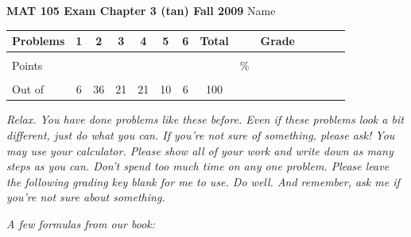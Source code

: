 \documentclass[12pt]{article}
\begin{document}
{\bf MAT 105 Exam Chapter 3 (tan) Fall 2009} \hspace{.4in} {\large Name} \hrulefill

\hrulefill


\begin{center}

\begin{tabular}
{|l|c|c|c|c|c|c|c|c|c|c|c|c|c|} \hline

 Problems & \hspace{5 pt} 1 \hspace{5 pt}  & \hspace{5 pt} 2 \hspace{5 pt} & \hspace{5 pt} 3 \hspace{5 pt} & \hspace{5 pt} 4 \hspace{5 pt} & \hspace{5 pt} 5 \hspace{5 pt} &  \hspace{5 pt} 6 \hspace{5 pt} &  \hspace{5 pt} Total  \hspace{5 pt} & &  \hspace{5 pt} Grade \hspace{5 pt}  \\ \hline
&&&&&&& &&\\  
Points &&&&&&& &    \hspace{.8in}\% &  \\ 
&&&&&& &&& \\  \hline
Out of & 6 & 36  & 21 & 21 & 10 & 6 &100 & & \\ \hline

\end {tabular}
 
\end{center}

\emph{Relax.  You have done problems like these before.  Even if these problems look a bit different, just do what you can.  If you're not sure of something, please ask! You may use your calculator.  Please show all of your work and write down as many steps as you can.  Don't spend too much time on any one problem.  Please leave the following grading key blank for me to use.  Do well.  And remember, ask me if you're not sure about something.}
 
 \vspace{.1 in}
 
 \emph{A few formulas from our book:}
  \vspace{.2in}
 
\end{document}
